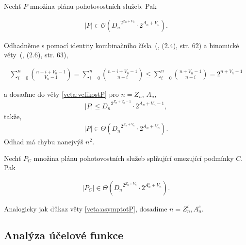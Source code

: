 \begin{veta}\label{veta:asymptotP}
  Nechť $P$ množina plánu pohotovostních služeb. Pak 

  \begin{align*}
    |P| \in \mathcal{O} \left ({D_n}^{2^{Z_n + V_n}} \cdot 2^{A_n + V_n} \right ).
  \end{align*}
\end{veta}

\begin{dukaz}
  Odhadněme s pomocí identity kombinačního čísla~(\citet{Diskretka}, (2.4), str. 62) a binomické věty~(\citet{Diskretka}, (2.6), str. 63),

  \begin{align*}
    \sum_{i=0}^{n} \binom{n - i + V_n - 1}{V_n - 1} =
    \sum_{i=0}^{n} \binom{n - i + V_n - 1}{n - i} \leq
    \sum_{i=0}^{n} \binom{n + V_n - 1}{n - i} =
    2^{n + V_n - 1}
  \end{align*}

  a dosaďme do věty \ref{veta:velikostP} pro $n = Z_n$, $A_n$,
  \begin{align*}
    |P| \leq {D_n}^{2^{Z_n + V_n - 1}} \cdot 2^{A_n + V_n - 1},
  \end{align*}
  takže,
  \begin{align*}
    |P| \in \Theta({D_n}^{2^{Z_n + V_n}} \cdot 2^{A_n + V_n}).
  \end{align*}
  Odhad má chybu nanejvýš $n^2$.
\end{dukaz}

\begin{veta}\label{veta:PCvelikost}
  Nechť $P_C$ množina plánu pohotovostních služeb splňující omezující podmínky $C$. Pak 

  \begin{align*}
    |P_C| \in \Theta({D_n}^{2^{Z^c_n + V_n}} \cdot 2^{A^c_n + V_n}).
  \end{align*}
\end{veta}

\begin{dukaz}
  Analogicky jak důkaz věty \ref{veta:asymptotP}, dosadíme $n = Z^c_n, A^c_n$.
\end{dukaz}

\subsection{Analýza účelové funkce}\label{kap:analVicF}

